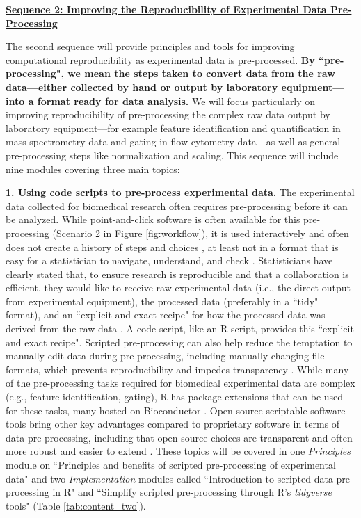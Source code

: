 \documentclass[pdftex,english,11.5pt,parskip=half]{scrartcl}
\begin{document}
\underline{\textbf{Sequence 2: Improving the Reproducibility of Experimental Data
Pre-Processing}}

The second sequence will provide principles and tools for improving
computational reproducibility as
experimental data is pre-processed. \textbf{By ``pre-processing", we mean the steps 
taken to convert data from the raw data---either collected by hand or output
by laboratory equipment---into a format ready for data analysis.} We will focus
particularly on improving reproducibility of pre-processing the complex 
raw data output by laboratory equipment---for example feature identification 
and quantification in mass spectrometry data and gating in flow cytometry data---as well
as general pre-processing steps like normalization and scaling. This sequence will include nine modules covering three main topics: 

\textbf{1. Using code scripts to pre-process experimental data.} The experimental data collected for biomedical research often requires 
pre-processing before it can be analyzed. While 
point-and-click software is often available for this pre-processing (Scenario 2 in Figure \ref*{fig:workflow}), it is used interactively and often does not create a history of steps and choices \cite{pernet2015improving}, at least not in a format that is easy for a statistician to navigate, understand, and check \cite{peng2011reproducible, pernet2015improving}. 
Statisticians have clearly stated that, to ensure research is reproducible and that a collaboration is efficient, they would like to receive raw experimental data (i.e., the direct output from experimental equipment), the processed data (preferably in a ``tidy" format), and an ``explicit and exact recipe" for how the processed data was derived from the raw data \cite{ellis2018share}.
A code script, like an R script, provides this ``explicit and exact recipe". Scripted pre-processing can also help reduce the temptation to manually edit data during pre-processing, including manually changing file formats, which prevents reproducibility and impedes transparency \cite{pernet2015improving}. While many of the pre-processing tasks required for biomedical experimental data are complex (e.g., feature identification, gating), R has package extensions that can be used for these tasks, many hosted on Bioconductor \cite{huber2015orchestrating}. 
Open-source scriptable
software tools bring other key advantages compared to proprietary software in terms of data
pre-processing, including that open-source choices are transparent and often more robust and easier to extend \cite{cetinkaya2017infrastructure, huber2015orchestrating,
brown2014reproducible, piccolo2016tools, baumer2018lessons}. 
These topics will be covered in one
\textit{Principles} module on ``Principles and benefits of scripted
pre-processing of experimental data" and two \textit{Implementation} modules
called ``Introduction to scripted data pre-processing in R" and ``Simplify
scripted pre-processing through R's \textit{tidyverse} tools" (Table \ref*{tab:content_two}).
\end{document}
